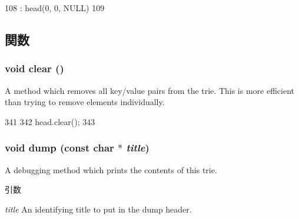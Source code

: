 \begin{DoxyCode}
108            : head(0, 0, NULL)
109     {}
\end{DoxyCode}


\subsection{関数}
\hypertarget{classTrie_ac8bb3912a3ce86b15842e79d0b421204}{
\subsubsection[{clear}]{\setlength{\rightskip}{0pt plus 5cm}void clear ()}}
\label{classTrie_ac8bb3912a3ce86b15842e79d0b421204}
A method which removes all key/value pairs from the trie. This is more efficient than trying to remove elements individually. 


\begin{DoxyCode}
341     {
342         head.clear();
343     }
\end{DoxyCode}
\hypertarget{classTrie_acf136bb7c799dc0e3c697a19cc2a61e8}{
\subsubsection[{dump}]{\setlength{\rightskip}{0pt plus 5cm}void dump (const char $\ast$ {\em title})}}
\label{classTrie_acf136bb7c799dc0e3c697a19cc2a61e8}
A debugging method which prints the contents of this trie. 
\begin{DoxyParams}{引数}
\item[{\em title}]An identifying title to put in the dump header. \end{DoxyParams}



